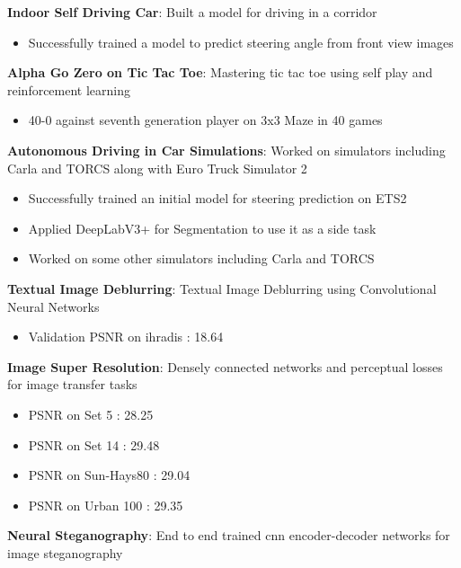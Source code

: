 \documentclass[letterpaper,11pt]{article}
\newcommand{\resumeItem}[2]{
  \item\small{
    \textbf{#1}{: #2 \vspace{-2pt}}
  }
}
\newcommand{\resumeSubItem}[2]{\resumeItem{#1}{#2}\vspace{-4pt}}
\begin{document}
      \resumeSubItem{Indoor Self Driving Car}
      {Built a model for driving in a corridor}
      \begin{itemize}
      \item Successfully trained a model to predict steering angle from front view images    
			\end{itemize}
    \resumeSubItem{Alpha Go Zero on Tic Tac Toe}
      {Mastering tic tac toe using self play and reinforcement learning}
      \begin{itemize}
      \item 40-0 against seventh generation player on 3x3 Maze in 40
games
			\end{itemize}
      
           \resumeSubItem{Autonomous Driving in Car Simulations}
      {Worked on simulators including Carla and TORCS along with Euro Truck Simulator 2}
      \begin{itemize}
      \item Successfully trained an initial model for steering prediction
on ETS2
\item Applied DeepLabV3+ for Segmentation to use it as a side task
\item Worked on some other simulators including Carla and TORCS
			\end{itemize}
      
      


    \resumeSubItem{Textual Image Deblurring}
      {Textual Image Deblurring using Convolutional Neural Networks}

 \begin{itemize}
      \item Validation PSNR on ihradis : 18.64
			\end{itemize}
    \resumeSubItem{Image Super Resolution}
      {Densely connected networks and perceptual losses for
image transfer tasks}






 \begin{itemize}
      \item PSNR on Set 5 : 28.25
      \item PSNR on Set 14 : 29.48
      \item PSNR on Sun-Hays80 : 29.04
      \item PSNR on Urban 100 : 29.35
			\end{itemize}
			
			 \resumeSubItem{Neural Steganography}
      {End to end trained cnn encoder-decoder networks for
image steganography}
\end{document}
